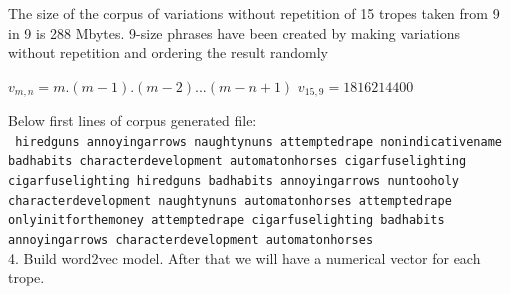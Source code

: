 \documentclass[letterpaper]{article}
\begin{document}
	The size of the corpus of variations without repetition of 15 tropes taken from 9 in 9 is 288 Mbytes. 9-size phrases have been created by making variations without repetition and ordering the result randomly \\
	
	\begin{center}
		
		${v}_{m,n} = m.(m-1).(m-2)...(m-n+1)$
		${v}_{15,9} = 1816214400$
		
	\end{center}
	
	Below first lines of corpus generated file:\\
	\texttt{    
		hiredguns annoyingarrows naughtynuns attemptedrape nonindicativename badhabits characterdevelopment automatonhorses cigarfuselighting    cigarfuselighting hiredguns badhabits annoyingarrows nuntooholy characterdevelopment naughtynuns automatonhorses attemptedrape    onlyinitforthemoney attemptedrape cigarfuselighting badhabits annoyingarrows characterdevelopment automatonhorses }\\
	
	
	
	
	4. Build word2vec model. After that we will have a numerical vector for each trope. \\
	
	
\end{document}
